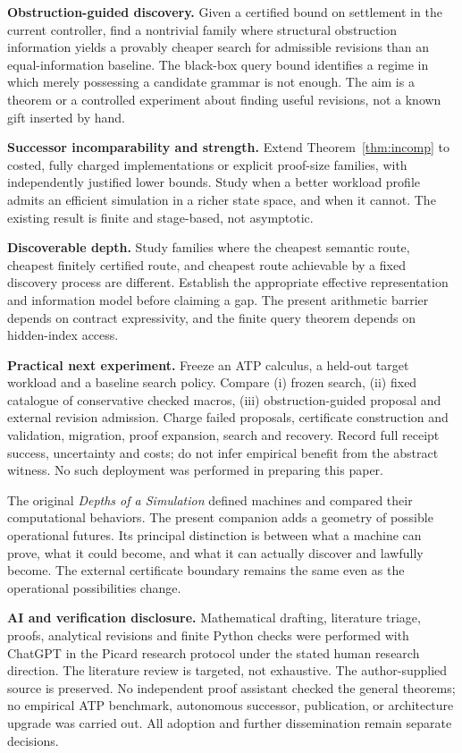 \documentclass[11pt]{article}
\theoremstyle{remark}\newtheorem{remark}[theorem]{Remark}
\begin{document}
\textbf{Obstruction-guided discovery.} Given a certified bound on settlement in the current controller, find a nontrivial family where structural obstruction information yields a provably cheaper search for admissible revisions than an equal-information baseline. The black-box query bound identifies a regime in which merely possessing a candidate grammar is not enough. The aim is a theorem or a controlled experiment about finding useful revisions, not a known gift inserted by hand.

\textbf{Successor incomparability and strength.} Extend Theorem~\ref{thm:incomp} to costed, fully charged implementations or explicit proof-size families, with independently justified lower bounds. Study when a better workload profile admits an efficient simulation in a richer state space, and when it cannot. The existing result is finite and stage-based, not asymptotic.

\textbf{Discoverable depth.} Study families where the cheapest semantic route, cheapest finitely certified route, and cheapest route achievable by a fixed discovery process are different. Establish the appropriate effective representation and information model before claiming a gap. The present arithmetic barrier depends on contract expressivity, and the finite query theorem depends on hidden-index access.

\textbf{Practical next experiment.} Freeze an ATP calculus, a held-out target workload and a baseline search policy. Compare (i) frozen search, (ii) fixed catalogue of conservative checked macros, (iii) obstruction-guided proposal and external revision admission. Charge failed proposals, certificate construction and validation, migration, proof expansion, search and recovery. Record full receipt success, uncertainty and costs; do not infer empirical benefit from the abstract witness. No such deployment was performed in preparing this paper.

The original \emph{Depths of a Simulation} defined machines and compared their computational behaviors. The present companion adds a geometry of possible operational futures. Its principal distinction is between what a machine can prove, what it could become, and what it can actually discover and lawfully become. The external certificate boundary remains the same even as the operational possibilities change.

\noindent\textbf{AI and verification disclosure.} Mathematical drafting, literature triage, proofs, analytical revisions and finite Python checks were performed with ChatGPT in the Picard research protocol under the stated human research direction. The literature review is targeted, not exhaustive. The author-supplied source is preserved. No independent proof assistant checked the general theorems; no empirical ATP benchmark, autonomous successor, publication, or architecture upgrade was carried out. All adoption and further dissemination remain separate decisions.
\end{document}
